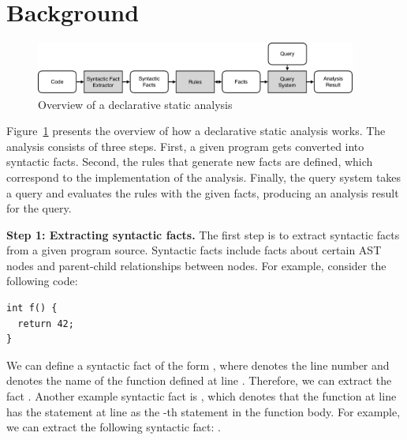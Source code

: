 \section{Background}\label{sec:background} 
\begin{figure}[t]
  \centering
  \vspace{2mm}
  \includegraphics[width=0.94\textwidth]{img/ov1.pdf}
  \caption{Overview of a declarative static analysis}
  \label{fig:ov1}
\end{figure}

Figure~\ref{fig:ov1} presents the overview of how a declarative static
analysis works.  The analysis consists of three steps.  First, a given program
gets converted into syntactic facts.  Second, the rules that generate new facts
are defined, which correspond to the implementation of the analysis.  Finally,
the query system takes a query and evaluates the rules with the
given facts, producing an analysis result for the query.


\textbf{Step 1: Extracting syntactic facts.}
The first step is to extract syntactic facts from a given program source.
Syntactic facts include facts about certain AST nodes and
parent-child relationships between nodes. For example, consider
the following code:

\begin{lstlisting}[style=mcpp]
int f() {
  return 42;
}
\end{lstlisting}
We can define a syntactic fact of the form , where
 denotes the line number and  denotes the name of the function
defined at line .  Therefore, we can extract the fact .  Another example syntactic fact is , which denotes that the function at line  has the statement
at line  as the -th statement in the function body.  For
example, we can extract the following syntactic fact: .

